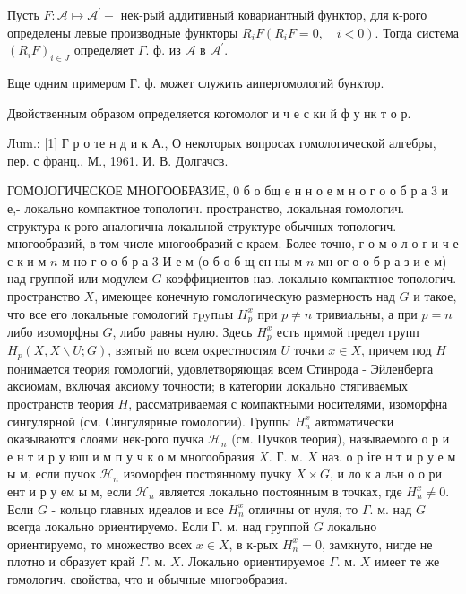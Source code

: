 \documentclass[10pt]{article}
\begin{document}
Пусть $F: \mathcal{A} \mapsto \mathcal{A}^{\prime}-$ нек-рый аддитивный ковариантный функтор, для к-рого определены левые производные функторы $R_{i} F\left(R_{i} F=0, \quad i<0\right)$. Тогда система $\left(R_{i} F\right)_{i \in J}$ определяет $\Gamma$. ф. из $\mathcal{A}$ в $\mathcal{A}^{\prime}$.



Еще одним примером Г. ф. может служить аипергомологий бунктор.



Двойственным образом определяется когомолог и ч е с ки й ф у нк т о р.



Лum.: [1] Г р о те н д и к А., О некоторых вопросах гомологической алгебры, пер. с франц., М., 1961. И. В. Долгачсв.



ГОМОЈОГИЧЕСКОЕ МНОГООБРАЗИЕ, 0 б о бщ е н н о е м н о г о о б р а 3 и е,- локально компактное топологич. пространство, локальная гомологич. структура к-рого аналогична локальной структуре обычных топологич. многообразий, в том числе многообразий с краем. Более точно, г о м о л о г и ч е с к и м $n$-м но г о о б р а 3 И е м (о б о б щ ен ны м $n$-мн ог о о б р а з и е м) над группой или модулем $G$ коэффициентов наз. локально компактное топологич. пространство $X$, имеющее конечную гомологическую размерность над $G$ и такое, что все его локальные гомологий гpyпnы $H_{p}^{x}$ при $p \neq n$ тривиальны, а при $p=n$ либо изоморфны $G$, либо равны нулю. Здесь $H_{p}^{x}$ есть прямой предел групп $H_{p}(X, X \backslash U ; G)$, взятый по всем окрестностям $U$ точки $x \in X$, причем под $H$ понимается теория гомологий, удовлетворяющая всем Стинрода - Эйленберга аксиомам, включая аксиому точности; в категории локально стягиваемых пространств теория $H$, рассматриваемая с компактными носителями, изоморфна сингулярной (см. Сингулярные гомологии). Группы $H_{n}^{x}$ автоматически оказываются слоями нек-рого пучка $\mathscr{H}_{n}$ (см. Пучков теория), называемого о р и е н т и р у юш и м п у ч к о м многообразия $X$. Г. м. $X$ наз. о р іге н т и р у е м ы м, если пучок $\mathscr{H}_{n}$ изоморфен постоянному пучку $X \times G$, и ло к а льн о о ри ент и р у ем ы м, если $\mathscr{H}_{n}$ является локально постоянным в точках, где $H_{n}^{x} \neq 0$. Если $G$ - кольцо главных идеалов и все $H_{n}^{x}$ отличны от нуля, то $\Gamma$. м. над $G$ всегда локально ориентируемо. Если Г. м. над группой $G$ локально ориентируемо, то множество всех $x \in X$, в к-рых $H_{n}^{x}=0$, замкнуто, нигде не плотно и образует край $\Gamma$. м. $X$. Локально ориентируемое $\Gamma$. м. $X$ имеет те же гомологич. свойства, что и обычные многообразия.
\end{document}
